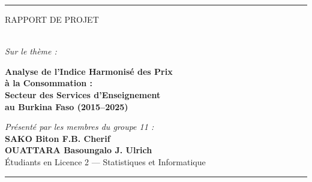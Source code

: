 \documentclass[
12pt,          %
a4paper,       %
oneside,       %
openright      %
]{report}
\begin{document}
\begin{titlepage}
	\vspace{0.6cm}
	
	{\color{couleurPrimaire}\rule{\linewidth}{1pt}}
	
	
	\vspace{0.5cm}
	
	\begin{center}
		{\large\bfseries\color{couleurGris}
			
			RAPPORT DE PROJET
		}\\[4pt]
		{\small\itshape Sur le thème :}
	\end{center}
	
	\vspace{0.4cm}
	
	\begin{tcolorbox}[
		enhanced,
		colback  = couleurPrimaire!8,
		colframe = couleurPrimaire,
		boxrule  = 1pt,
		arc      = 6pt,
		left     = 10pt,
		right    = 10pt,
		top      = 8pt,
		bottom   = 8pt
		]
		\begin{center}
			{\large\bfseries\color{couleurPrimaire}
				Analyse de l'Indice Harmonisé des Prix\\
				à la Consommation :\\[4pt]
				Secteur des Services d'Enseignement\\
				au Burkina Faso (2015--2025)
			}
		\end{center}
	\end{tcolorbox}
	
	\vspace{0.6cm}
	
	\begin{center}
		{\small\itshape Présenté par les membres du groupe 11 :}\\[8pt]
		{\large\bfseries\color{couleurPrimaire}
			SAKO Biton F.B. Cherif\\[4pt]
			OUATTARA Basoungalo J. Ulrich
		}\\[4pt]
		{\small\color{couleurGris}
			Étudiants en Licence 2 --- Statistiques et Informatique
		}
	\end{center}
	
	\vspace{0.5cm}
	
	{\color{couleurPrimaire}\rule{\linewidth}{0.5pt}}
	

\end{titlepage}
\end{document}
